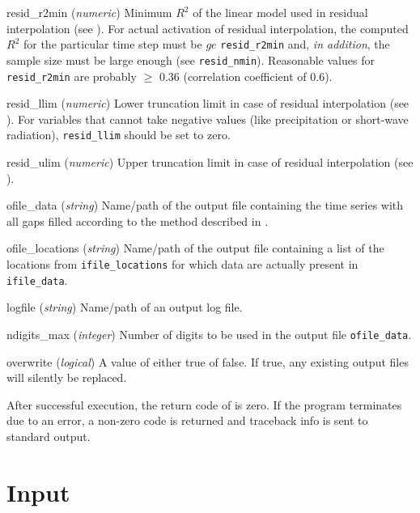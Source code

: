 \begin{columndef}
  \item[resid\_r2min] (\textit{numeric}) Minimum $R^2$ of the linear model used in residual interpolation (see ). For actual activation of residual interpolation, the computed $R^2$ for the particular time step must be $ge$ \verb!resid_r2min! and, \emph{in addition}, the sample size must be large enough (see \verb!resid_nmin!). Reasonable values for \verb!resid_r2min! are probably $\ge$ 0.36 (correlation coefficient of 0.6).
  \item[resid\_llim] (\textit{numeric}) Lower truncation limit in case of residual interpolation (see ). For variables that cannot take negative values (like precipitation or short-wave radiation), \verb!resid_llim! should be set to zero.
  \item[resid\_ulim] (\textit{numeric}) Upper truncation limit in case of residual interpolation (see ).
  \item[ofile\_data] (\textit{string}) Name/path of the output file containing the time series with all gaps filled according to the method described in .
  \item[ofile\_locations] (\textit{string}) Name/path of the output file containing a list of the locations from \verb!ifile_locations! for which data are actually present in \verb!ifile_data!.
  \item[logfile] (\textit{string}) Name/path of an output log file.
  \item[ndigits\_max] (\textit{integer}) Number of digits to be used in the output file \verb!ofile_data!.
  \item[overwrite] (\textit{logical}) A value of either true of false. If true, any existing output files will silently be replaced.
\end{columndef}

After successful execution, the return code of  is zero. If the program terminates due to an error, a non-zero code is returned and traceback info is sent to standard output.

\section{Input} \label{sec:meteofill:input}

